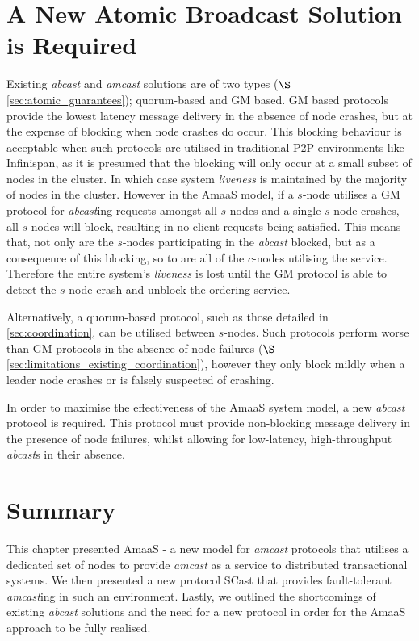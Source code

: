 \section{A New Atomic Broadcast Solution is Required}
Existing \emph{abcast} and \emph{amcast} solutions are of two types ($\S$ \ref{sec:atomic_guarantees}); quorum-based and GM based.  GM based protocols provide the lowest latency message delivery in the absence of node crashes, but at the expense of blocking when node crashes do occur.  This blocking behaviour is acceptable when such protocols are utilised in traditional P2P environments like Infinispan, as it is presumed that the blocking will only occur at a small subset of nodes in the cluster.  In which case system \emph{liveness} is maintained by the majority of nodes in the cluster.  However in the \textsf{AmaaS} model, if a $s$-node utilises a GM protocol for \emph{abcast}ing requests amongst all $s$-nodes and a single $s$-node crashes, all $s$-nodes will block, resulting in no client requests being satisfied. This means that, not only are the $s$-nodes participating in the \emph{abcast} blocked, but as a consequence of this blocking, so to are all of the $c$-nodes utilising the service.  Therefore the entire system's \emph{liveness} is lost until the GM protocol is able to detect the $s$-node crash and unblock the ordering service.  

Alternatively, a quorum-based protocol, such as those detailed in \ref{sec:coordination}, can be utilised between $s$-nodes.  Such protocols perform worse than GM protocols in the absence of node failures ($\S$ \ref{sec:limitations_existing_coordination}), however they only block mildly when a leader node crashes or is falsely suspected of crashing.  

In order to maximise the effectiveness of the \textsf{AmaaS} system model, a new \emph{abcast} protocol is required.  This protocol must provide non-blocking message delivery in the presence of node failures, whilst allowing for low-latency, high-throughput \emph{abcast}s in their absence.  

\section{Summary}
This chapter presented \textsf{AmaaS} - a new model for \emph{amcast} protocols that utilises a dedicated set of nodes to provide \emph{amcast} as a service to distributed transactional systems.  We then presented a new protocol \textsf{SCast} that provides fault-tolerant \emph{amcast}ing in such an environment.  Lastly, we outlined the shortcomings of existing \emph{abcast} solutions and the need for a new protocol in order for the \textsf{AmaaS} approach to be fully realised. 
